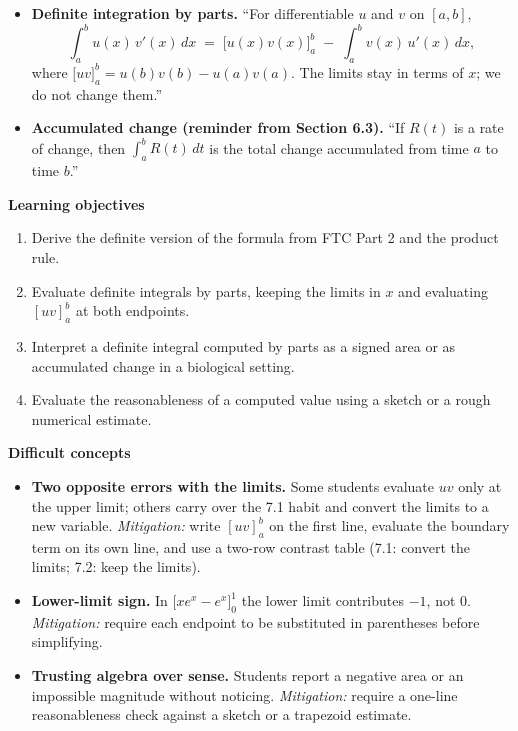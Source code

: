 \documentclass[11pt]{article}
\begin{document}
\begin{defbox}
\begin{itemize}
\item \textbf{Definite integration by parts.} ``For differentiable $u$ and $v$ on $[a,b]$,
\[ \int_a^b u(x)\,v'(x)\,dx \;=\; \big[u(x)v(x)\big]_a^b \;-\; \int_a^b v(x)\,u'(x)\,dx, \]
where $\big[uv\big]_a^b = u(b)v(b) - u(a)v(a)$. The limits stay in terms of $x$; we do not change them.''
\item \textbf{Accumulated change (reminder from Section 6.3).} ``If $R(t)$ is a rate of change, then $\int_a^b R(t)\,dt$ is the total change accumulated from time $a$ to time $b$.''
\end{itemize}
\end{defbox}

\textbf{Learning objectives}
\begin{enumerate}
\item Derive the definite version of the formula from FTC Part 2 and the product rule.
\item Evaluate definite integrals by parts, keeping the limits in $x$ and evaluating $[uv]_a^b$ at both endpoints.
\item Interpret a definite integral computed by parts as a signed area or as accumulated change in a biological setting.
\item Evaluate the reasonableness of a computed value using a sketch or a rough numerical estimate.
\end{enumerate}

\textbf{Difficult concepts}
\begin{itemize}
\item \textbf{Two opposite errors with the limits.} Some students evaluate $uv$ only at the upper limit; others carry over the 7.1 habit and convert the limits to a new variable. \emph{Mitigation:} write $[uv]_a^b$ on the first line, evaluate the boundary term on its own line, and use a two-row contrast table (7.1: convert the limits; 7.2: keep the limits).
\item \textbf{Lower-limit sign.} In $\big[xe^x - e^x\big]_0^1$ the lower limit contributes $-1$, not $0$. \emph{Mitigation:} require each endpoint to be substituted in parentheses before simplifying.
\item \textbf{Trusting algebra over sense.} Students report a negative area or an impossible magnitude without noticing. \emph{Mitigation:} require a one-line reasonableness check against a sketch or a trapezoid estimate.
\end{itemize}
\end{document}
